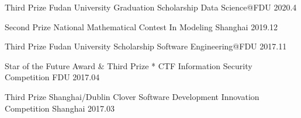 



\begin{cvhonors}
  \cvhonor
    {Third Prize} %
    {Fudan University Graduation Scholarship} %
    {Data Science@FDU} %
    {2020.4} %

\cvhonor
  {Second Prize} %
  {National Mathematical Contest In Modeling} %
  {Shanghai} %
  {2019.12} %

  \cvhonor
    {Third Prize} %
    {Fudan University Scholarship} %
    {Software Engineering@FDU} %
    {2017.11} %

  \cvhonor
    {Star of the Future Award \& Third Prize} %
    {* CTF Information Security Competition} %
    {FDU} %
    {2017.04} %

  \cvhonor
    {Third Prize} %
    {Shanghai/Dublin Clover Software Development Innovation Competition} %
    {Shanghai} %
    {2017.03} %
\end{cvhonors}
